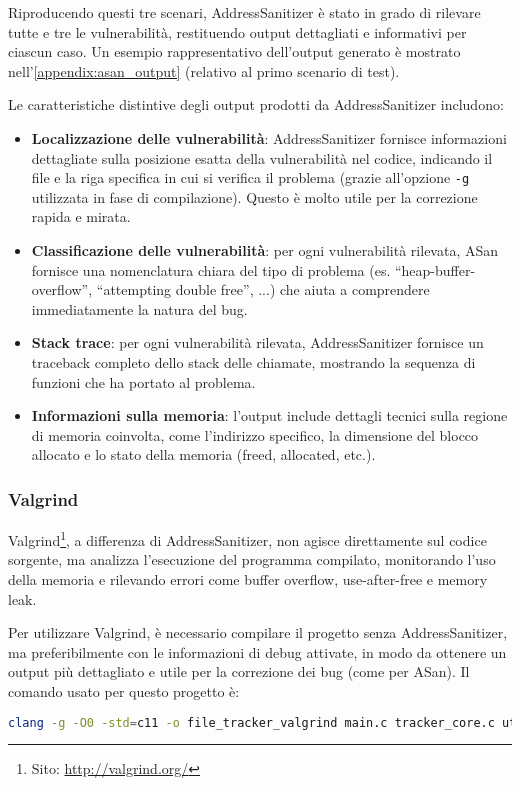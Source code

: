 Riproducendo questi tre scenari, AddressSanitizer è stato in grado di rilevare
tutte e tre le vulnerabilità, restituendo output dettagliati e informativi per ciascun
caso. Un esempio rappresentativo dell'output generato è mostrato nell'\autoref{appendix:asan_output}
(relativo al primo scenario di test).

Le caratteristiche distintive degli output prodotti da AddressSanitizer
includono:
\begin{itemize}
  \item \textbf{Localizzazione delle vulnerabilità}: AddressSanitizer fornisce informazioni
    dettagliate sulla posizione esatta della vulnerabilità nel codice, indicando
    il file e la riga specifica in cui si verifica il problema (grazie all'opzione
    \texttt{-g} utilizzata in fase di compilazione). Questo è molto utile per la
    correzione rapida e mirata.

  \item \textbf{Classificazione delle vulnerabilità}: per ogni vulnerabilità rilevata,
    ASan fornisce una nomenclatura chiara del tipo di problema (es. ``heap-buffer-overflow'',
    ``attempting double free'', ...) che aiuta a comprendere immediatamente la natura
    del bug.

  \item \textbf{Stack trace}: per ogni vulnerabilità rilevata, AddressSanitizer
    fornisce un traceback completo dello stack delle chiamate, mostrando la sequenza
    di funzioni che ha portato al problema.

  \item \textbf{Informazioni sulla memoria}: l'output include dettagli tecnici sulla
    regione di memoria coinvolta, come l'indirizzo specifico, la dimensione del blocco
    allocato e lo stato della memoria (freed, allocated, etc.).
\end{itemize}

\subsubsection*{Valgrind}
Valgrind\footnote{Sito: \url{http://valgrind.org/}}, a differenza di
AddressSanitizer, non agisce direttamente sul codice sorgente, ma analizza l'esecuzione
del programma compilato, monitorando l'uso della memoria e rilevando errori come
buffer overflow, use-after-free e memory leak.

Per utilizzare Valgrind, è necessario compilare il progetto senza AddressSanitizer,
ma preferibilmente con le informazioni di debug attivate, in modo da ottenere un
output più dettagliato e utile per la correzione dei bug (come per ASan). Il
comando usato per questo progetto è: \begin{lstlisting}[language=bash, numbers=none]
clang -g -O0 -std=c11 -o file_tracker_valgrind main.c tracker_core.c utils.c
\end{lstlisting}

